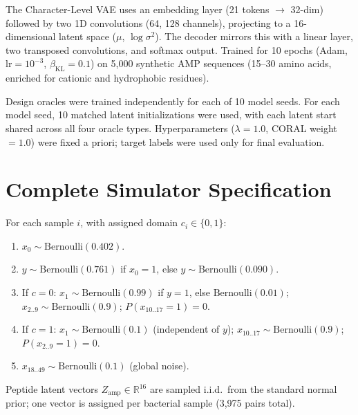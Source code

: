 \documentclass{article}
\begin{document}
The Character-Level VAE uses an embedding layer (21 tokens $\to$ 32-dim) followed by two 1D convolutions (64, 128 channels), projecting to a 16-dimensional latent space ($\mu$, $\log\sigma^2$). The decoder mirrors this with a linear layer, two transposed convolutions, and softmax output. Trained for 10 epochs (Adam, lr$=10^{-3}$, $\beta_{\text{KL}}=0.1$) on 5,000 synthetic AMP sequences (15--30 amino acids, enriched for cationic and hydrophobic residues).

Design oracles were trained independently for each of 10 model seeds. For each model seed, 10 matched latent initializations were used, with each latent start shared across all four oracle types. Hyperparameters ($\lambda=1.0$, CORAL weight$=1.0$) were fixed a priori; target labels were used only for final evaluation.

\section{Complete Simulator Specification} \label{sec:simulator}
For each sample $i$, with assigned domain $c_i \in \{0,1\}$:
\begin{enumerate}
    \item $x_0 \sim \text{Bernoulli}(0.402)$.
    \item $y \sim \text{Bernoulli}(0.761)$ if $x_0{=}1$, else $y \sim \text{Bernoulli}(0.090)$.
    \item If $c{=}0$: $x_1 \sim \text{Bernoulli}(0.99)$ if $y{=}1$, else $\text{Bernoulli}(0.01)$; $x_{2..9} \sim \text{Bernoulli}(0.9)$; $P(x_{10..17}{=}1) = 0$.
    \item If $c{=}1$: $x_1 \sim \text{Bernoulli}(0.1)$ (independent of $y$); $x_{10..17} \sim \text{Bernoulli}(0.9)$; $P(x_{2..9}{=}1) = 0$.
    \item $x_{18..49} \sim \text{Bernoulli}(0.1)$ (global noise).
\end{enumerate}
Peptide latent vectors $Z_{\text{amp}} \in \mathbb{R}^{16}$ are sampled i.i.d.\ from the standard normal prior; one vector is assigned per bacterial sample (3,975 pairs total).
\end{document}
